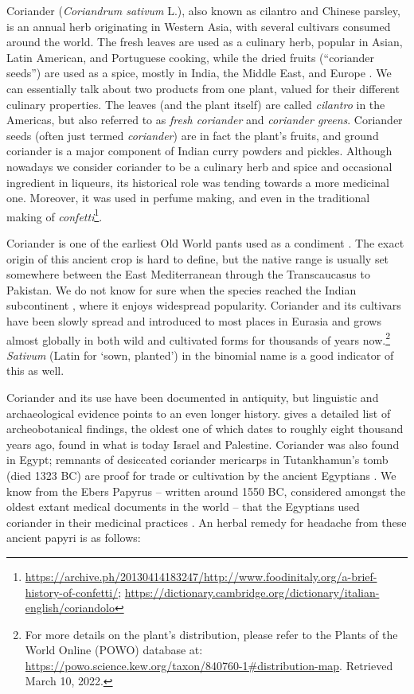 Coriander (\textit{Coriandrum sativum} L.), also known as cilantro and Chinese parsley, is an annual herb originating in Western Asia, with several \glspl{cultivar} consumed around the world. The fresh leaves are used as a culinary herb, popular in Asian, Latin American, and Portuguese cooking, while the dried fruits (``coriander seeds'') are used as a spice, mostly in India, the Middle East, and Europe \parencite{davidson_oxford_2014}. We can essentially talk about two products from one plant, valued for their different culinary properties. The leaves (and the plant itself) are called \textit{cilantro} in the Americas, but also referred to as \textit{fresh coriander} and \textit{coriander greens}. Coriander seeds (often just termed \textit{coriander}) are in fact the plant’s fruits, and ground coriander is a major component of Indian curry powders and pickles. Although nowadays we consider coriander to be a culinary herb and spice and occasional ingredient in liqueurs, its historical role was tending towards a more medicinal one. Moreover, it was used in perfume making, and even in the traditional making of \textit{confetti}\footnote{\url{https://archive.ph/20130414183247/http://www.foodinitaly.org/a-brief-history-of-confetti/}; \url{https://dictionary.cambridge.org/dictionary/italian-english/coriandolo}}.

Coriander is one of the earliest Old World pants used as a condiment \parencite{zohary_domestication_2012}. The exact origin of this ancient crop is hard to define, but the native range is usually set somewhere between the East Mediterranean through the Transcaucasus to Pakistan. We do not know for sure when the species reached the Indian subcontinent \parencite{prance_cultural_2005}, where it enjoys widespread popularity. Coriander and its cultivars have been slowly spread and introduced to most places in Eurasia and grows almost globally in both wild and cultivated forms for thousands of years now.\footnote{For more details on the plant’s distribution, please refer to the Plants of the World Online (POWO) database at: \url{https://powo.science.kew.org/taxon/840760-1\#distribution-map}. Retrieved March 10, 2022.} \textit{Sativum} (Latin for `sown, planted') in the binomial name is a good indicator of this as well.

Coriander and its use have been documented in antiquity, but linguistic and archaeological evidence points to an even longer history. \textcite[163]{zohary_domestication_2012} gives a detailed list of archeobotanical findings, the oldest one of which dates to roughly eight thousand years ago, found in what is today Israel and Palestine. Coriander was also found in Egypt; remnants of desiccated coriander mericarps in Tutankhamun’s tomb (died 1323 BC) are proof for trade or cultivation by the ancient Egyptians \parencite{zohary_domestication_2012}. We know from the Ebers Papyrus – written around 1550 BC, considered amongst the oldest extant medical documents in the world – that the Egyptians used coriander in their medicinal practices \parencite{prance_cultural_2005}. An herbal remedy for headache from these ancient papyri is as follows:

